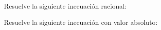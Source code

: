\documentclass[addpoints,spanish, 12pt,a4paper]{exam}
\begin{document}
\begin{questions}




\question Resuelve la siguiente inecuación racional:\begin{parts} 
\part[2] $\dfrac{x^{2} - 4}{x^{2} - 9} \geq  0$\begin{solution} $\left(-\infty, -3\right) \cup \left[-2, 2\right] \cup \left(3, \infty\right)$\end{solution} 
\end{parts} 


\question Resuelve la siguiente inecuación con valor absoluto:\begin{parts} 

\end{parts}
\end{questions}
\end{document}
